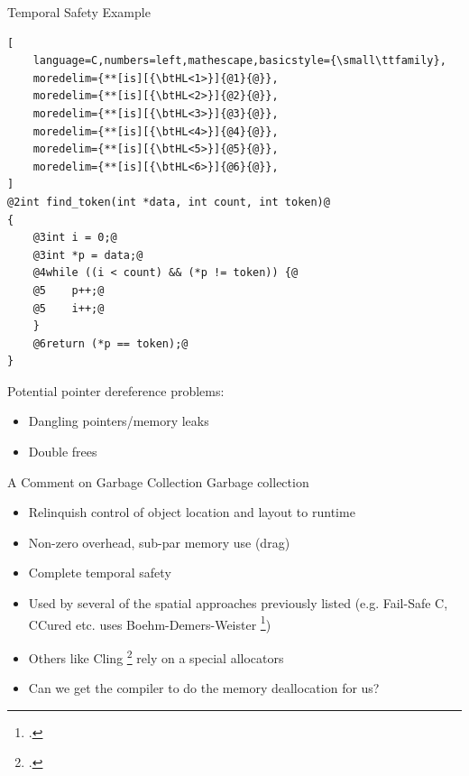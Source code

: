 \documentclass[aspectratio=169]{beamer}
\begin{document}
\begin{frame}[fragile]{Temporal Safety Example}
\footnotesize
{}
\begin{lstlisting}[
    language=C,numbers=left,mathescape,basicstyle={\small\ttfamily},
    moredelim={**[is][{\btHL<1>}]{@1}{@}},
    moredelim={**[is][{\btHL<2>}]{@2}{@}},
    moredelim={**[is][{\btHL<3>}]{@3}{@}},
    moredelim={**[is][{\btHL<4>}]{@4}{@}},
    moredelim={**[is][{\btHL<5>}]{@5}{@}},
    moredelim={**[is][{\btHL<6>}]{@6}{@}},
]
@2int find_token(int *data, int count, int token)@
{
    @3int i = 0;@
    @3int *p = data;@
    @4while ((i < count) && (*p != token)) {@
    @5    p++;@
    @5    i++;@
    }
    @6return (*p == token);@
}
\end{lstlisting}


\footnotesize{
Potential pointer dereference problems:
  \begin{itemize}
      \item Dangling pointers/memory leaks
      \item Double frees
  \end{itemize}
}
\end{frame}

\begin{frame}{A Comment on Garbage Collection}
Garbage collection
    \begin{itemize}
        \item Relinquish control of object location and layout to runtime 
        \item Non-zero overhead, sub-par memory use (drag) 
        \item Complete temporal safety
        \item Used by several of the spatial approaches previously listed (e.g. Fail-Safe C, CCured etc. uses Boehm-Demers-Weister \footcite{boehm_garbage_1988})
        \item Others like Cling \footcite{akritidis_cling:_???} rely on a special allocators %
        \item Can we get the \alert{compiler} to do the memory deallocation for us? %
    \end{itemize}
\end{frame}
\end{document}
